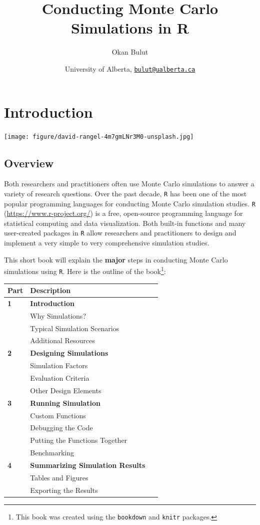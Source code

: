 \documentclass[
]{book}
\title{Conducting Monte Carlo Simulations in R}
\author{Okan Bulut}
\date{University of Alberta, \href{mailto:bulut@ualberta.ca}{\nolinkurl{bulut@ualberta.ca}}}
\begin{document}
\maketitle

{
\setcounter{tocdepth}{1}
\tableofcontents
}
\hypertarget{intro}{%
\chapter{Introduction}\label{intro}}

\texttt{[image: figure/david-rangel-4m7gmLNr3M0-unsplash.jpg]}

\hypertarget{overview}{%
\section{Overview}\label{overview}}

Both researchers and practitioners often use Monte Carlo simulations to answer a variety of research questions. Over the past decade, \texttt{R} \citep{R-base} has been one of the most popular programming languages for conducting Monte Carlo simulation studies. \texttt{R} (\url{https://www.r-project.org/}) is a free, open-source programming language for statistical computing and data visualization. Both built-in functions and many user-created packages in \texttt{R} allow researchers and practitioners to design and implement a very simple to very comprehensive simulation studies.

This short book will explain the \textbf{major} steps in conducting Monte Carlo simulations using \texttt{R}. Here is the outline of the book\footnote{This book was created using the \texttt{bookdown} \citep{R-bookdown} and \texttt{knitr} \citep{R-knitr} packages.}:

\begin{longtable}[]{@{}ll@{}}
\toprule
Part & Description\tabularnewline
\midrule
\endhead
\textbf{1} & \textbf{Introduction} ~~\tabularnewline
& Why Simulations?\tabularnewline
& Typical Simulation Scenarios\tabularnewline
& Additional Resources\tabularnewline
\textbf{2} & \textbf{Designing Simulations} ~~\tabularnewline
& Simulation Factors\tabularnewline
& Evaluation Criteria\tabularnewline
& Other Design Elements\tabularnewline
\textbf{3} & \textbf{Running Simulation} ~~\tabularnewline
& Custom Functions\tabularnewline
& Debugging the Code\tabularnewline
& Putting the Functions Together\tabularnewline
& Benchmarking\tabularnewline
\textbf{4} & \textbf{Summarizing Simulation Results} ~~\tabularnewline
& Tables and Figures\tabularnewline
& Exporting the Results\tabularnewline
\bottomrule
\end{longtable}
\end{document}
